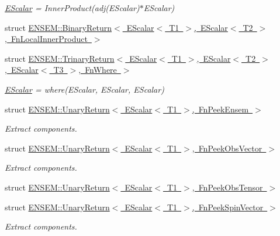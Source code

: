 \begin{DoxyCompactItemize}
\begin{DoxyCompactList}\small\item\em \mbox{\hyperlink{classENSEM_1_1EScalar}{E\+Scalar}} = Inner\+Product(adj(\+E\+Scalar)$\ast$\+E\+Scalar) \end{DoxyCompactList}\item 
struct \mbox{\hyperlink{structENSEM_1_1BinaryReturn_3_01EScalar_3_01T1_01_4_00_01EScalar_3_01T2_01_4_00_01FnLocalInnerProduct_01_4}{E\+N\+S\+E\+M\+::\+Binary\+Return$<$ E\+Scalar$<$ T1 $>$, E\+Scalar$<$ T2 $>$, Fn\+Local\+Inner\+Product $>$}}
\item 
struct \mbox{\hyperlink{structENSEM_1_1TrinaryReturn_3_01EScalar_3_01T1_01_4_00_01EScalar_3_01T2_01_4_00_01EScalar_3_01T3_01_4_00_01FnWhere_01_4}{E\+N\+S\+E\+M\+::\+Trinary\+Return$<$ E\+Scalar$<$ T1 $>$, E\+Scalar$<$ T2 $>$, E\+Scalar$<$ T3 $>$, Fn\+Where $>$}}
\begin{DoxyCompactList}\small\item\em \mbox{\hyperlink{classENSEM_1_1EScalar}{E\+Scalar}} = where(\+E\+Scalar, E\+Scalar, E\+Scalar) \end{DoxyCompactList}\item 
struct \mbox{\hyperlink{structENSEM_1_1UnaryReturn_3_01EScalar_3_01T1_01_4_00_01FnPeekEnsem_01_4}{E\+N\+S\+E\+M\+::\+Unary\+Return$<$ E\+Scalar$<$ T1 $>$, Fn\+Peek\+Ensem $>$}}
\begin{DoxyCompactList}\small\item\em Extract components. \end{DoxyCompactList}\item 
struct \mbox{\hyperlink{structENSEM_1_1UnaryReturn_3_01EScalar_3_01T1_01_4_00_01FnPeekObsVector_01_4}{E\+N\+S\+E\+M\+::\+Unary\+Return$<$ E\+Scalar$<$ T1 $>$, Fn\+Peek\+Obs\+Vector $>$}}
\begin{DoxyCompactList}\small\item\em Extract components. \end{DoxyCompactList}\item 
struct \mbox{\hyperlink{structENSEM_1_1UnaryReturn_3_01EScalar_3_01T1_01_4_00_01FnPeekObsTensor_01_4}{E\+N\+S\+E\+M\+::\+Unary\+Return$<$ E\+Scalar$<$ T1 $>$, Fn\+Peek\+Obs\+Tensor $>$}}
\item 
struct \mbox{\hyperlink{structENSEM_1_1UnaryReturn_3_01EScalar_3_01T1_01_4_00_01FnPeekSpinVector_01_4}{E\+N\+S\+E\+M\+::\+Unary\+Return$<$ E\+Scalar$<$ T1 $>$, Fn\+Peek\+Spin\+Vector $>$}}
\begin{DoxyCompactList}\small\item\em Extract components. \end{DoxyCompactList}\item 

\end{DoxyCompactItemize}
